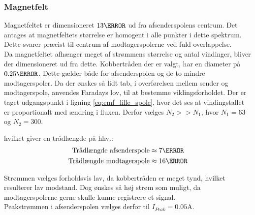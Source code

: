 \subsubsection{Magnetfelt}
Magnetfeltet er dimensioneret $13\mm$ ud fra afsenderspolens centrum.
Det antages at magnetfeltets størrelse er homogent i alle punkter i dette spektrum.
Dette svarer præcist til centrum af modtagerspolerne ved fuld overlappelse.\\
Da magnetfeltet afhænger meget af strømmens størrelse og antal vindinger, bliver der dimensioneret ud fra dette.
Kobbertråden der er valgt, har en diameter på $0.25\mm$.
Dette gælder både for afsenderspolen og de to mindre modtagerspoler.
Da der ønskes så lidt tab, i overførelsen mellem sender og modtagerspole, anvendes Faradays lov, til at bestemme viklingsforholdet.
Der er taget udgangspunkt i ligning \ref{eq:emf_lille_spole}, hvor det ses at vindingstallet er proportionalt med ændring i fluxen.
Derfor vælges $N_2>>N_1$, hvor $N_1 = 63$ og $N_2 = 300$.

hvilket giver en trådlængde på hhv.:
\begin{align}
	\text{Trådlængde afsenderspole} & \approx 7\m  \nonumber \\
	\text{Trådlængde modtagerspole} & \approx 16\m \nonumber
\end{align}

Strømmen vælges forholdsvis lav, da kobbertråden er meget tynd, hvilket resulterer lav modstand. 
Dog ønskes så høj strøm som muligt, da modtagerspolerne gerne skulle kunne registrere et signal.\\
Peakstrømmen i afsenderspolen vælges derfor til $I_{Peak} = 0.05\si{\ampere}$.

